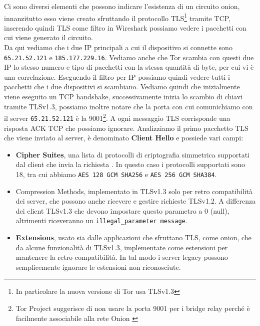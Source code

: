 Ci sono diversi elementi che possono indicare l'esistenza di un circuito onion, innanzitutto esso viene creato sfruttando il protocollo TLS\footnote{In particolare la nuova versione di Tor usa TLSv1.3} tramite TCP, inserendo quindi TLS come filtro in Wireshark possiamo vedere i pacchetti con cui viene generato il circuito.
\\
Da qui vediamo che i due IP principali a cui il dispositivo si connette sono \lstinline{65.21.52.121} e \lstinline{185.177.229.16}. Vediamo anche che Tor scambia con questi due IP lo stesso numero e tipo di pacchetti con la stessa quantità di byte, per cui vi è una correlazione.
Eseguendo il filtro per IP possiamo quindi vedere tutti i pacchetti che i due dispositivi si scambiano.
\newpage
{}
Vediamo quindi che inizialmente viene eseguito un TCP handshake, successivamente inizia lo scambio di chiavi tramite TLSv1.3, possiamo inoltre notare che la porta con cui comunichiamo con il server \lstinline{65.21.52.121} è la 9001\footnote{Tor Project suggerisce di non usare la porta 9001 per i bridge relay perché è facilmente associabile alla rete Onion \cite{OnionAvoid9001}}.
A ogni messaggio TLS corrisponde una risposta ACK TCP che possiamo ignorare.
\newpage
Analizziamo il primo pacchetto TLS che viene inviato al server, è denominato \textbf{Client Hello} e possiede vari campi:
\begin{itemize}
    \item \textbf{Cipher Suites}, una lista di protocolli di criptografia simmetrica supportati dal client che invia la richiesta \cite{RFC8448}. In questo caso i protocolli supportati sono 18, tra cui abbiamo \lstinline{AES 128 GCM SHA256} e \lstinline{AES 256 GCM SHA384}.
    \item Compression Methods, implementato in TLSv1.3 solo per retro compatibilità dei server, che possono anche ricevere e gestire richieste TLSv1.2. A differenza dei client TLSv1.3 che devono impostare questo parametro a 0 (null), altrimenti riceveranno un \lstinline{illegal_parameter message}.
    \item \textbf{Extensions}, usato sia dalle applicazioni che sfruttano TLS, come onion, che da alcune funzionalità di TLSv1.3, implementate come estensioni per mantenere la retro compatibilità. In tal modo i server legacy possono semplicemente ignorare le estensioni non riconosciute.
\end{itemize}
